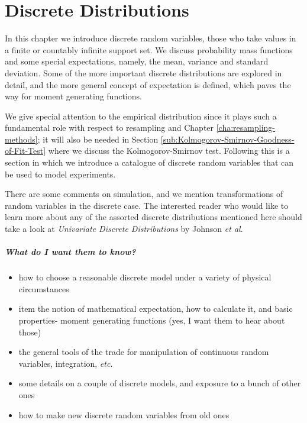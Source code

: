 \documentclass[captions=tableheading]{scrbook}
\begin{document}
\chapter{Discrete Distributions}
\label{sec-5}

\label{cha:Discrete-Distributions}

\noindent In this chapter we introduce discrete random variables, those who take values in a finite or countably infinite support set. We discuss probability mass functions and some special expectations, namely, the mean, variance and standard deviation. Some of the more important discrete distributions are explored in detail, and the more general concept of expectation is defined, which paves the way for moment generating functions. 

We give special attention to the empirical distribution since it plays such a fundamental role with respect to resampling and Chapter \ref{cha:resampling-methods}; it will also be needed in Section \ref{sub:Kolmogorov-Smirnov-Goodness-of-Fit-Test} where we discuss the Kolmogorov-Smirnov test. Following this is a section in which we introduce a catalogue of discrete random variables that can be used to model experiments.

There are some comments on simulation, and we mention transformations of random variables in the discrete case. The interested reader who would like to learn more about any of the assorted discrete distributions mentioned here should take a look at \emph{Univariate Discrete Distributions} by Johnson \emph{et al}\cite{Johnson1993}.


\paragraph*{What do I want them to know?}

\begin{itemize}
\item how to choose a reasonable discrete model under a variety of physical circumstances
\item item the notion of mathematical expectation, how to calculate it, and basic properties- moment generating functions (yes, I want them to hear about those)
\item the general tools of the trade for manipulation of continuous random variables, integration, \emph{etc}.
\item some details on a couple of discrete models, and exposure to a bunch of other ones
\item how to make new discrete random variables from old ones
\end{itemize}
\end{document}
